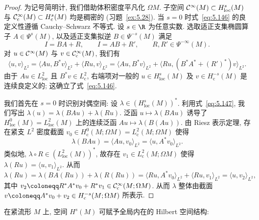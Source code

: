 \begin{proof}
为记号简明计, 我们借助体积密度平凡化 $\Omega M$. 子空间 $\mathcal{C}^\infty(M) \subset H_{\mathrm{loc}}^s(M)$ 与 $\mathcal{C}_{\mathrm{c}}^\infty(M) \subset H_{\mathrm{c}}^s(M)$ 均是稠密的 (习题~\ref{ex:5.28}). 当 $s = 0$ 时式~\eqref{eq:5.146} 的良定义性遵循 Cauchy--Schwarz 不等式. 设 $s \in \R$ 为任意实数. 选取适正支集椭圆算子 $A \in \Psi^s(M)$, 以及适正支集拟逆 $B \in \Psi^{-s}(M)$ 满足
\begin{equation}\label{eq:5.147}
    I = B A + R, \qquad I = A B + R', \qquad R, R' \in \Psi^{-\infty}(M).
\end{equation}
对 $u \in \mathcal{C}^\infty(M)$ 与 $v \in \mathcal{C}_{\mathrm{c}}^\infty(M)$, 我们有
\begin{equation}\label{eq:5.148}
    \langle u, v \rangle_{L^2} = \langle A u, B^* v \rangle_{L^2} + \langle R u, v \rangle_{L^2} = \langle A u, B^* v \rangle_{L^2} + \langle R u, (B^* A^* + (R')^*) v \rangle_{L^2}.
\end{equation}
由于 $A u \in L_{\mathrm{loc}}^2$ 且 $B^* v \in L_{\mathrm{c}}^2$, 右端项对一般的 $u \in H_{\mathrm{loc}}^s(M)$ 及 $v \in H_{\mathrm{c}}^{-s}(M)$ 是连续良定义的; 这确立了式~\eqref{eq:5.146}.

我们首先在 $s = 0$ 时识别对偶空间: 设 $\lambda \in (H_{\mathrm{loc}}^s(M))^*$. 利用式~\eqref{eq:5.147}, 我们写出 $\lambda(u) = \lambda(B A u) + \lambda(R u)$. 泛函 $u \mapsto \lambda(B A u)$ 诱导了 $H_{\mathrm{loc}}^0(M) = L_{\mathrm{loc}}^2(M)$ 上的连续泛函 $A u \mapsto \lambda(B(A u))$. 由 Riesz 表示定理, 存在紧支 $L^2$ 密度截面 $v_0 \in H_{\mathrm{c}}^0(M; \Omega M) = L_{\mathrm{c}}^2(M; \Omega M)$ 使得
\begin{equation}\label{eq:5.149}
    \lambda(B A u) = \langle A u, v_0 \rangle_{L^2} = \langle u, A^* v_0 \rangle_{L^2}.
\end{equation}
类似地, $\lambda \circ R \in (L_{\mathrm{loc}}^2(M))^*$, 故存在 $v_1 \in L_{\mathrm{c}}^2(M; \Omega M)$ 使得 $\lambda(R u) = \langle u, v_1 \rangle_{L^2}$. 从而
\begin{equation}\label{eq:5.150}
    \lambda(R u) = \lambda(B A(R u)) + \lambda(R(R u)) = \langle R u, A^* v_0 \rangle_{L^2} + \langle R u, v_1 \rangle_{L^2} = \langle u, v_2 \rangle_{L^2},
\end{equation}
其中 $v_2 \defeq R^* A^* v_0 + R^* v_1 \in \mathcal{C}_{\mathrm{c}}^\infty(M; \Omega M)$. 从而 $\lambda$ 整体由截面 $v \defeq A^* v_0 + v_2 \in H_{\mathrm{c}}^{-s}(M; \Omega M)$ 所表示.
\end{proof}

在紧流形 $M$ 上, 空间 $H^s(M)$ 可赋予全局内在的 Hilbert 空间结构:

